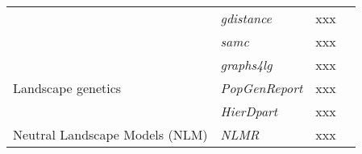 \documentclass[smallextended]{svjour3}       %
\begin{document}
\begin{landscape}
\begin{center}
\begin{table}
\begin{tabularx}{0.9\linewidth}{XXXX}
      & \textit{gdistance} & xxx & \cite{vanEtten2017} \\
      & \textit{samc} & xxx & \cite{Marx2020} \\
      \hline
      \multirow{3}{*}{Landscape genetics} & \textit{graphs4lg} & xxx & \cite{Savary2020} \\
      & \textit{PopGenReport} & xxx & \cite{Adamack2014,Gruber2015} \\
      & \textit{HierDpart} & xxx & \cite{Qin2019} \\
      \hline
      Neutral Landscape Models (NLM) & \textit{NLMR} & xxx & \cite{Sciaini2018} \\
      \hline
    \end{tabularx}
  \end{table}
\end{center}

\end{landscape}



\end{document}

